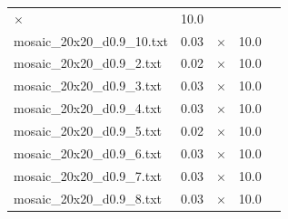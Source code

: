 \documentclass{article}
\begin{document}
\begin{center}
\begin{tabular}{lrrrr}
$\times$
 & 10.0 & 
\\
mosaic\_20x20\_d0.9\_10.txt & 0.03 & 
$\times$
 & 10.0 & 
\\
mosaic\_20x20\_d0.9\_2.txt & 0.02 & 
$\times$
 & 10.0 & 
\\
mosaic\_20x20\_d0.9\_3.txt & 0.03 & 
$\times$
 & 10.0 & 
\\
mosaic\_20x20\_d0.9\_4.txt & 0.03 & 
$\times$
 & 10.0 & 
\\
mosaic\_20x20\_d0.9\_5.txt & 0.02 & 
$\times$
 & 10.0 & 
\\
mosaic\_20x20\_d0.9\_6.txt & 0.03 & 
$\times$
 & 10.0 & 
\\
mosaic\_20x20\_d0.9\_7.txt & 0.03 & 
$\times$
 & 10.0 & 
\\
mosaic\_20x20\_d0.9\_8.txt & 0.03 & 
$\times$
 & 10.0 & 
\\
\hline\end{tabular}
\end{center}
\end{document}
